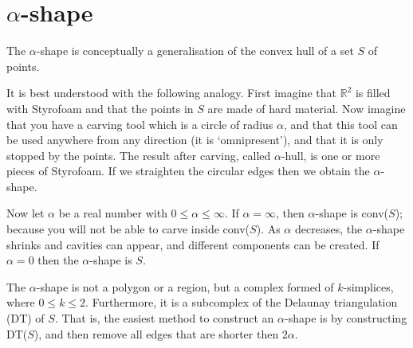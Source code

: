 %
\section{$\alpha$-shape}

The $\alpha$-shape is conceptually a generalisation of the convex hull of a set $S$ of points.

%

It is best understood with the following analogy.
First imagine that $\mathbb{R}^2$ is filled with Styrofoam and that the points in $S$ are made of hard material.
Now imagine that you have a carving tool which is a circle of radius $\alpha$, and that this tool can be used anywhere from any direction (it is `omnipresent'), and that it is only stopped by the points.
The result after carving, called $\alpha$-hull, is one or more pieces of Styrofoam.
If we straighten the circular edges then we obtain the $\alpha$-shape.

%

Now let $\alpha$ be a real number with $0 \leq \alpha \leq \infty$.
If $\alpha = \infty$, then $\alpha$-shape is conv($S$); because you will not be able to carve inside conv($S$).
As $\alpha$ decreases, the $\alpha$-shape shrinks and cavities can appear, and different components can be created.
If $\alpha = 0$ then the $\alpha$-shape is $S$.

%

The $\alpha$-shape is not a polygon or a region, but a complex formed of $k$-simplices, where $0 \leq k \leq 2$.
Furthermore, it is a subcomplex of the Delaunay triangulation (DT) of $S$.
That is, the easiest method to construct an $\alpha$-shape is by constructing DT($S$), and then remove all edges that are shorter then $2\alpha$.

